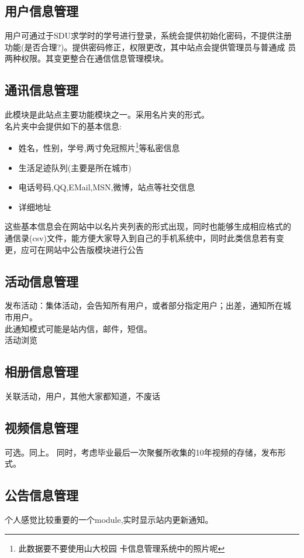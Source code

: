 \documentclass[12pt,a4paper,twocolumn]{article}
\begin{document}
\subsection{用户信息管理}
用户可通过于SDU求学时的学号进行登录，系统会提供初始化密码，不提供注册
功能(是否合理?)。提供密码修正，权限更改，其中站点会提供管理员与普通成
员两种权限。其变更整合在通信信息管理模块。
\subsection{通讯信息管理}
此模块是此站点主要功能模块之一。采用名片夹的形式。\\
名片夹中会提供如下的基本信息:
\begin{itemize}
\item 姓名，性别，学号,两寸免冠照片\footnote{此数据要不要使用山大校园
    卡信息管理系统中的照片呢}等私密信息
\item 生活足迹队列(主要是所在城市)
\item 电话号码,QQ,EMail,MSN,微博，站点等社交信息
\item 详细地址
\end{itemize}
这些基本信息会在网站中以名片夹列表的形式出现，同时也能够生成相应格式的
通信录(csv)文件，能方便大家导入到自己的手机系统中，同时此类信息若有变
更，应可在网站中公告版模块进行公告
\subsection{活动信息管理}
发布活动：集体活动，会告知所有用户，或者部分指定用户；出差，通知所在城
市用户。\\
此通知模式可能是站内信，邮件，短信。\\
活动浏览
\subsection{相册信息管理}
关联活动，用户，其他大家都知道，不废话
\subsection{视频信息管理}
可选。同上。
同时，考虑毕业最后一次聚餐所收集的10年视频的存储，发布形式。
\subsection{公告信息管理}
个人感觉比较重要的一个module,实时显示站内更新通知。
\end{document}
